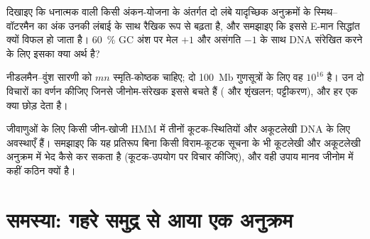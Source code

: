 \begin{exercise}[$\star\star\star$]\label{exo:b3:bioinformatics:10}
दिखाइए कि धनात्मक  वाली किसी अंकन-योजना के अंतर्गत दो
लंबे यादृच्छिक अनुक्रमों के स्मिथ--वॉटरमैन  का अंक उनकी
लंबाई के साथ रैखिक रूप से बढ़ता है, और समझाइए कि इससे E-मान सिद्धांत
क्यों विफल हो जाता है। \qty{60}{\%} GC अंश पर मेल $+1$ और असंगति $-1$
के साथ DNA संरेखित करने के लिए इसका क्या अर्थ है?
\end{exercise}

\begin{exercise}[$\star\star\star$]\label{exo:b3:bioinformatics:11}
नीडलमैन--वुंश सारणी को $mn$ स्मृति-कोष्ठक चाहिए; दो
\qty{100}{Mb} गुणसूत्रों के लिए वह $10^{16}$ है। उन दो विचारों का वर्णन
कीजिए जिनसे जीनोम-संरेखक इससे बचते हैं ( और शृंखलन; पट्टीकरण), और हर
एक क्या छोड़ देता है।
\end{exercise}

\begin{exercise}[$\star\star\star$]\label{exo:b3:bioinformatics:12}
जीवाणुओं के लिए किसी जीन-खोजी HMM में तीनों कूटक-स्थितियों और अकूटलेखी
DNA के लिए अवस्थाएँ हैं। समझाइए कि यह प्रतिरूप बिना किसी विराम-कूटक
सूचना के भी कूटलेखी और अकूटलेखी अनुक्रम में भेद कैसे कर सकता है
(कूटक-उपयोग पर विचार कीजिए), और वही उपाय मानव जीनोम में कहीं कठिन क्यों है।
\end{exercise}

\section{समस्या: गहरे समुद्र से आया एक अनुक्रम}

